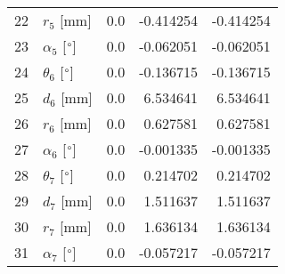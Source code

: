 \documentclass{standalone}%
\begin{document}
\begin{tabular}{llrrr}
22 &              $r_{5}$ [mm] &       0.0 &  -0.414254 &  -0.414254 \\
23 &  $\alpha_{5}$ [$\degree$] &       0.0 &  -0.062051 &  -0.062051 \\
24 &  $\theta_{6}$ [$\degree$] &       0.0 &  -0.136715 &  -0.136715 \\
25 &              $d_{6}$ [mm] &       0.0 &   6.534641 &   6.534641 \\
26 &              $r_{6}$ [mm] &       0.0 &   0.627581 &   0.627581 \\
27 &  $\alpha_{6}$ [$\degree$] &       0.0 &  -0.001335 &  -0.001335 \\
28 &  $\theta_{7}$ [$\degree$] &       0.0 &   0.214702 &   0.214702 \\
29 &              $d_{7}$ [mm] &       0.0 &   1.511637 &   1.511637 \\
30 &              $r_{7}$ [mm] &       0.0 &   1.636134 &   1.636134 \\
31 &  $\alpha_{7}$ [$\degree$] &       0.0 &  -0.057217 &  -0.057217 \\
\bottomrule
\end{tabular}
%
\end{document}
